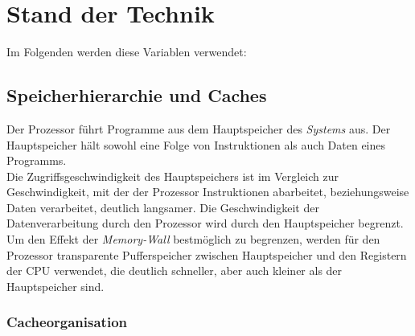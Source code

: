 \documentclass[]{scrbook}
\newtheorem{defi}{Definition}
\begin{document}
\chapter{Stand der Technik}

Im Folgenden werden diese Variablen verwendet:

\medskip
\noindent{}
\medskip

\section{Speicherhierarchie und Caches}

Der Prozessor führt Programme aus dem Hauptspeicher des \textsl{\gls{System}s} aus. 
Der Hauptspeicher hält sowohl eine Folge von Instruktionen als auch Daten eines Programms.
\\
Die Zugriffsgeschwindigkeit des Hauptspeichers ist im Vergleich zur Geschwindigkeit, mit der der Prozessor Instruktionen abarbeitet, beziehungsweise Daten verarbeitet, deutlich langsamer.
Die Geschwindigkeit der Datenverarbeitung durch den Prozessor wird durch den Hauptspeicher begrenzt.
Um den Effekt der \textsl{Memory-Wall} bestmöglich zu begrenzen, werden für den Prozessor transparente Pufferspeicher zwischen Hauptspeicher und den Registern der CPU verwendet, die deutlich schneller, aber auch kleiner als der Hauptspeicher sind.

\subsection{Cacheorganisation}
\end{document}
